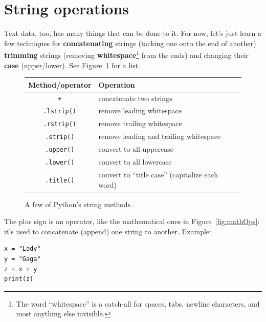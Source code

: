 \section{String operations}

\label{concatenatingStrings}
Text data, too, has many things that can be done to it. For now, let's just
learn a few techniques for \textbf{concatenating} strings (tacking one onto the
end of another) \textbf{trimming} strings (removing
\textbf{whitespace}\footnote{The word ``whitespace'' is a catch-all for spaces,
tabs, newline characters, and most anything else invisible.} from the ends) and
changing their \textbf{case} (upper/lower). See Figure~\ref{fig:stringOps} for
a list.


\begin{figure}[ht]
\small
\centering
\begin{tabular}{c | l}
\hline
Method/operator & Operation \\
\hline
\texttt{+} & concatenate two strings \\
\texttt{.lstrip()} & remove leading whitespace \\
\texttt{.rstrip()} & remove trailing whitespace \\
\texttt{.strip()} & remove leading and trailing whitespace \\
\texttt{.upper()} & convert to all uppercase \\
\texttt{.lower()} & convert to all lowercase \\
\texttt{.title()} & convert to ``title case'' (capitalize each word) \\
\hline
\end{tabular}
\smallskip
\caption{A few of Python's string methods.}
\label{fig:stringOps}
\end{figure}

The plus sign is an operator, like the mathematical ones in
Figure~\ref{fig:mathOps}: it's used to concatenate (append) one string to
another. Example:

\begin{Verbatim}[fontsize=\small,samepage=true,frame=single,framesep=3mm]
x = "Lady"
y = "Gaga"
z = x + y
print(z)
\end{Verbatim}

